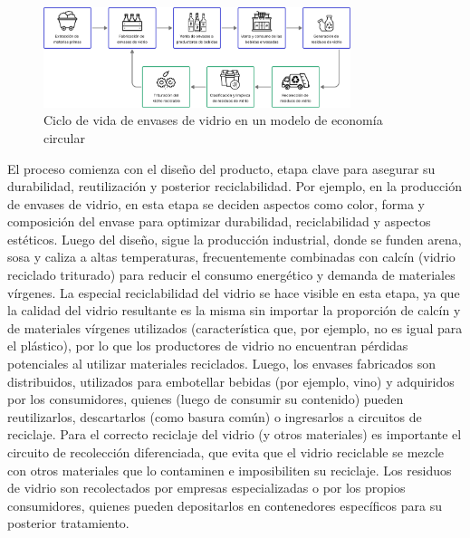 \begin{figure}[!tb]
    \centering
    \includegraphics[width=0.8\textwidth]{Figures/glass-lifecycle.png}
    \caption{Ciclo de vida de envases de vidrio en un modelo de economía circular}
    \label{fig:glass-lifecycle}
\end{figure}


El proceso comienza con el diseño del producto, etapa clave para asegurar su durabilidad, reutilización y posterior reciclabilidad. Por ejemplo, en la producción de envases de vidrio, en esta etapa se deciden aspectos como color, forma y composición del envase para optimizar durabilidad, reciclabilidad y aspectos estéticos. Luego del diseño, sigue la producción industrial, donde se funden arena, sosa y caliza a altas temperaturas, frecuentemente combinadas con calcín (vidrio reciclado triturado) para reducir el consumo energético y demanda de materiales vírgenes. La especial reciclabilidad del vidrio se hace visible en esta etapa, ya que la calidad del vidrio resultante es la misma sin importar la proporción de calcín y de materiales vírgenes utilizados (característica que, por ejemplo, no es igual para el plástico), por lo que los productores de vidrio no encuentran pérdidas potenciales al utilizar materiales reciclados. Luego, los envases fabricados son distribuidos, utilizados para embotellar bebidas (por ejemplo, vino) y adquiridos por los consumidores, quienes (luego de consumir su contenido) pueden reutilizarlos, descartarlos (como basura común) o ingresarlos a circuitos de reciclaje. Para el correcto reciclaje del vidrio (y otros materiales) es importante el circuito de recolección diferenciada, que evita que el vidrio reciclable se mezcle con otros materiales que lo contaminen e imposibiliten su reciclaje. Los residuos de vidrio son recolectados por empresas especializadas o por los propios consumidores, quienes pueden depositarlos en contenedores específicos para su posterior tratamiento.
